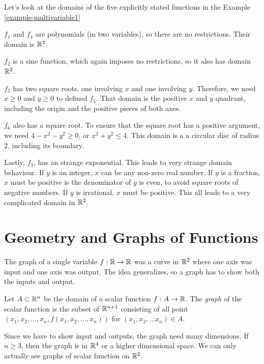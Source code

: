 \documentclass[fleqn,letterpaper]{report}
\begin{document}
\begin{example}
Let's look at the domains of the five explicitly stated
functions in the Example \ref{example-multivariable1}
\begin{smallitemize}
\item $f_1$ and $f_4$ are polynomials (in
two variables), so there are no restrictions. Their
domain is $\mathbb{R}^2$. 
\item $f_2$ is a sine function, which again
imposes no restrictions, so it also has domain $\mathbb{R}^2$.
\item $f_5$ has two square roots, one involving $x$ and one
involving $y$. Therefore, we need $x\geq 0$ and $y \geq 0$ to
defined $f_5$. That domain is the positive $x$ and $y$
quadrant, including the origin and the positive pieces of
both axes.
\item $f_6$ also has a square root. To ensure that the square
root has a positive argument, we need $4 - x^2 - y^2 \geq 0$,
or $x^2 + y^2 \leq 4$. This domain is a a circular disc of radius
$2$, including its boundary.
\item Lastly, $f_3$, has an strange exponential. This
leads to very strange domain behaviour. If $y$ is an integer,
$x$ can be any non-zero real number. If $y$ is a fraction,
$x$ must be positive is the denominator of $y$ is even, to
avoid square roots of negative numbers. If $y$ is irrational,
$x$ must be positive. This all leads to a very complicated
domain in $\mathbb{R}^2$.
\end{smallitemize}
\end{example}

\section{Geometry and Graphs of Functions}
\label{graphs}

The graph of a single variable $f: \mathbb{R} \rightarrow \mathbb{R}$ was a
curve in $\mathbb{R}^2$ where one axis was input and one axis was
output. The idea generalizes, so a graph has to show both the
inputs and output.

\begin{defn}
Let $A \subset \mathbb{R}^n$ be the domain of a scalar function $f: A
\rightarrow \mathbb{R}$. The \emph{graph} of the scalar function is
the subset of $\mathbb{R}^{n+1}$ consisting of all point $(x_1, x_2,
\ldots, x_n, f(x_1, x_2, \ldots, x_n))$ for $(x_1, x_2, \ldots
x_n) \in A$.
\end{defn}

Since we have to show input and outputs, the graph need many
dimensions. If $n \geq 3$, then the graph is in $\mathbb{R}^4$ or a
higher dimensional space. We can only actually see graphs of
scalar function on $\mathbb{R}^2$.
\end{document}

